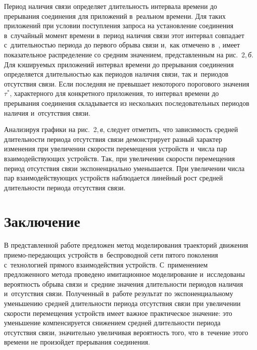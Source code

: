 \begin{multicols}{2}


  
  Период наличия связи определяет длительность интервала времени до 
прерывания соединения
 для приложений в~реальном времени. Для таких 
приложений при условии поступления запроса на уста\-нов\-ле\-ние соединения 
в~случайный момент времени в~период наличия связи этот интервал совпадает 
с~длительностью периода до первого обрыва связи и,~как отмечено  
в~\cite{14-g1}, имеет показательное распределение со средним значением, 
представленным на рис.~2,\,\textit{б}. Для кэшируемых приложений интервал 
времени до прерывания соединения определяется длительностью как периодов 
наличия связи, так и~периодов отсутствия связи. Если последняя не превышает 
некоторого порогового значения~$\tau^*$, характерного для конкретного 
приложения, то интервал времени до прерывания соединения складывается из 
нескольких последовательных периодов наличия и~отсутствия связи. 

Анализируя графики на рис.~2,\,\textit{в}, следует от\-метить, что 
зависимость средней длительности пери\-о\-да отсутствия связи демонстрирует 
разный характер изменения при увеличении ско\-рости перемещения устройств 
и~числа пар взаимодействующих устройств. Так, при увеличении скорости 
перемещения период отсутствия связи экспоненциально уменьшается. При 
увеличении числа пар взаимодействующих устройств наблюдается линейный 
рост средней длительности периода отсутствия \mbox{связи}.

\section{Заключение}

  В представленной работе предложен метод моделирования траекторий 
движения при\-емо-пе\-ре\-да\-ющих устройств в~беспроводной сети пятого 
поколения с~технологией прямого взаимодействия устройств. С~применением 
предложенного метода проведено имитационное моделирование и~исследованы 
вероятность обрыва связи и~средние значения длительности периодов наличия 
и~отсутствия связи. Полученный в~работе результат по экспоненциальному 
уменьшению средней длительности периода отсутствия связи при увеличении 
ско\-рости перемещения устройств имеет важное практическое значение: это 
уменьшение компенсируется снижением средней длительности периода 
отсутствия связи, значительно увеличивая вероятность того, что в~течение 
этого времени не произойдет прерывания со\-еди\-не\-ния. 


\end{multicols}
